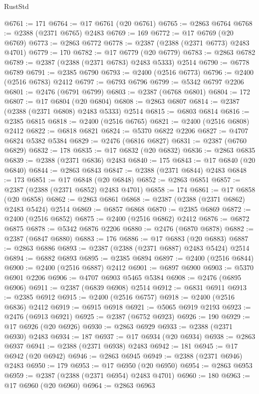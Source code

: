 \begin{lexlean}{RustStd}
\begin{coremodule}
@6761 := 171
@6764 := @17 @6761 (@20 @6761)
@6765 := @2863 @6764
@6768 := @2388 (@2371 @6765) @2483
@6769 := 169
@6772 := @17 @6769 (@20 @6769)
@6773 := @2863 @6772
@6778 := @2387 (@2388 (@2371 @6773) @2483 @4701)
@6779 := 170
@6782 := @17 @6779 (@20 @6779)
@6783 := @2863 @6782
@6789 := @2387 (@2388 (@2371 @6783) @2483 @5333) @2514
@6790 := @6778 @6789
@6791 := @2385 @6790
@6793 := @2400 (@2516 @6773)
@6796 := @2400 (@2516 @6783) @2412
@6797 := @6793 @6796
@6799 := @5342 @6797 @2206
@6801 := @2476 (@6791 @6799)
@6803 := @2387 (@6768 @6801)
@6804 := 172
@6807 := @17 @6804 (@20 @6804)
@6808 := @2863 @6807
@6814 := @2387 (@2388 (@2371 @6808) @2483 @5333) @2514
@6815 := @6803 @6814
@6816 := @2385 @6815
@6818 := @2400 (@2516 @6765)
@6821 := @2400 (@2516 @6808) @2412
@6822 := @6818 @6821
@6824 := @5370 @6822 @2206
@6827 := @4707 @6824 @5382 @5384
@6829 := @2476 (@6816 @6827)
@6831 := @2387 (@6760 @6829)
@6832 := 178
@6835 := @17 @6832 (@20 @6832)
@6836 := @2863 @6835
@6839 := @2388 (@2371 @6836) @2483
@6840 := 175
@6843 := @17 @6840 (@20 @6840)
@6844 := @2863 @6843
@6847 := @2388 (@2371 @6844) @2483
@6848 := 173
@6851 := @17 @6848 (@20 @6848)
@6852 := @2863 @6851
@6857 := @2387 (@2388 (@2371 @6852) @2483 @4701)
@6858 := 174
@6861 := @17 @6858 (@20 @6858)
@6862 := @2863 @6861
@6868 := @2387 (@2388 (@2371 @6862) @2483 @5424) @2514
@6869 := @6857 @6868
@6870 := @2385 @6869
@6872 := @2400 (@2516 @6852)
@6875 := @2400 (@2516 @6862) @2412
@6876 := @6872 @6875
@6878 := @5342 @6876 @2206
@6880 := @2476 (@6870 @6878)
@6882 := @2387 (@6847 @6880)
@6883 := 176
@6886 := @17 @6883 (@20 @6883)
@6887 := @2863 @6886
@6893 := @2387 (@2388 (@2371 @6887) @2483 @5424) @2514
@6894 := @6882 @6893
@6895 := @2385 @6894
@6897 := @2400 (@2516 @6844)
@6900 := @2400 (@2516 @6887) @2412
@6901 := @6897 @6900
@6903 := @5370 @6901 @2206
@6906 := @4707 @6903 @5465 @5384
@6908 := @2476 (@6895 @6906)
@6911 := @2387 (@6839 @6908) @2514
@6912 := @6831 @6911
@6913 := @2385 @6912
@6915 := @2400 (@2516 @6757)
@6918 := @2400 (@2516 @6836) @2412
@6919 := @6915 @6918
@6921 := @5065 @6919 @2193
@6923 := @2476 (@6913 @6921)
@6925 := @2387 (@6752 @6923)
@6926 := 190
@6929 := @17 @6926 (@20 @6926)
@6930 := @2863 @6929
@6933 := @2388 (@2371 @6930) @2483
@6934 := 187
@6937 := @17 @6934 (@20 @6934)
@6938 := @2863 @6937
@6941 := @2388 (@2371 @6938) @2483
@6942 := 181
@6945 := @17 @6942 (@20 @6942)
@6946 := @2863 @6945
@6949 := @2388 (@2371 @6946) @2483
@6950 := 179
@6953 := @17 @6950 (@20 @6950)
@6954 := @2863 @6953
@6959 := @2387 (@2388 (@2371 @6954) @2483 @4701)
@6960 := 180
@6963 := @17 @6960 (@20 @6960)
@6964 := @2863 @6963

\end{coremodule}
\end{lexlean}
